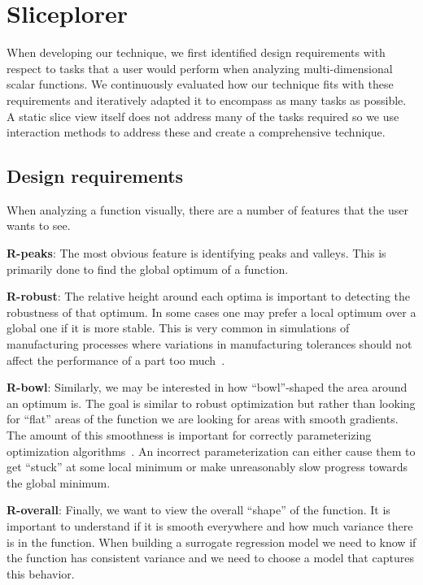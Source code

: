 \section{Sliceplorer}

When developing our technique, we first identified design requirements with
respect to tasks that a user would perform when analyzing multi-dimensional
scalar functions. We continuously evaluated how our technique fits with these
requirements and iteratively adapted it to encompass as many tasks as possible.
A static slice view itself does not address many of the tasks required so we
use interaction methods to address these and create a comprehensive technique.  

\subsection{Design requirements}

When analyzing a function visually, there are a number of features that the
user wants to see.

\textbf{R-peaks}: The most obvious feature
is identifying peaks and valleys. This is primarily done to find the
global optimum of a function. 

\textbf{R-robust}: The relative height
around each optima is important to detecting the robustness of that optimum. In
some cases one may prefer a local optimum over a global one if it is more stable.
This is very common in
simulations of manufacturing processes where variations in manufacturing tolerances
should not affect the performance of a part too much~\cite{Berger:2011}.  

\textbf{R-bowl}: Similarly, we may be
interested in how ``bowl''-shaped the area around an optimum is. The goal is
similar to robust optimization but rather than looking for ``flat'' areas of
the function we are looking for areas with smooth gradients. The amount of this
smoothness is important for correctly parameterizing optimization
algorithms~\cite{Back:1996}. An incorrect parameterization can either cause them to
get ``stuck'' at some local minimum or make unreasonably slow progress towards
the global minimum. 

\textbf{R-overall}: Finally, we want to view the overall ``shape'' of the
function. It is important to understand if it is smooth everywhere and how much
variance there is in the function. When building a surrogate regression model
we need to know if the function has consistent variance and we need to choose a
model that captures this behavior. 

